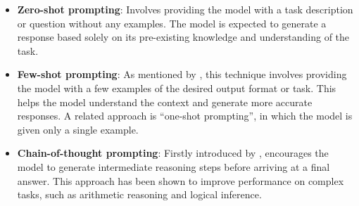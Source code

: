 \begin{itemize}
    \item \textbf{Zero-shot prompting}: Involves providing the model with a task description or question without any examples. The model is expected to generate a response based solely on its pre-existing knowledge and understanding of the task.
    \item \textbf{Few-shot prompting}: As mentioned by \cite{gpt3Paper}, this technique involves providing the model with a few examples of the desired output format or task. This helps the model understand the context and generate more accurate responses. A related approach is ``one-shot prompting'', in which the model is given only a single example.
    \item \textbf{Chain-of-thought prompting}: Firstly introduced by \cite{chainofthought2023}, encourages the model to generate intermediate reasoning steps before arriving at a final answer. This approach has been shown to improve performance on complex tasks, such as arithmetic reasoning and logical inference.
\end{itemize}






     

